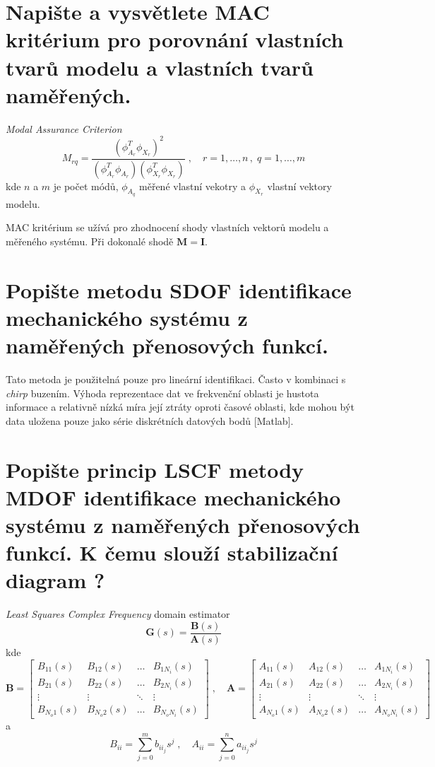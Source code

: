 \documentclass{article}
\begin{document}
	\section{Napište a vysvětlete MAC kritérium pro porovnání vlastních tvarů modelu a vlastních tvarů naměřených. }
	\emph{Modal Assurance Criterion}
	\begin{equation}
	M_{rq} = \frac{(\phi_{A_r}^T \phi_{X_r})^2}{(\phi_{A_r}^T\phi_{A_r})(\phi_{X_r}^T\phi_{X_r})}
	\;,\quad 
	r = 1,\dots,n \,,\; q = 1,\dots,m
	\end{equation}
	kde $n$ a $m$ je počet módů, $\phi_{A_q}$ měřené vlastní vekotry a $\phi_{X_r}$ vlastní vektory modelu.

	MAC kritérium se užívá pro zhodnocení shody vlastních vektorů modelu a měřeného systému. Při dokonalé shodě $\bm{M} = \bm{I}$.

	\section{Popište metodu SDOF identifikace mechanického systému z naměřených přenosových funkcí. }
	Tato metoda je použitelná pouze pro lineární identifikaci. Často v kombinaci s \emph{chirp} buzením. Výhoda reprezentace dat ve frekvenční oblasti je hustota informace a relativně nízká míra její ztráty oproti časové oblasti, kde mohou být data uložena pouze jako série diskrétních datových bodů [Matlab].

	\section{Popište princip LSCF metody MDOF identifikace mechanického systému z naměřených přenosových funkcí. K čemu slouží stabilizační diagram ? }
	\emph{Least Squares Complex Frequency} domain estimator
	\begin{equation}
		\bm{G}(s) = \frac{\bm{B}(s)}{\bm{A}(s)}
	\end{equation}
	kde
	\begin{equation}
		\bm{B}
		=
		\begin{bmatrix}
			B_{11}(s) & B_{12}(s) & \dots & B_{1N_i}(s) \\
			B_{21}(s) & B_{22}(s) & \dots & B_{2N_i}(s) \\
			\vdots & \vdots & \ddots & \vdots \\
			B_{N_o 1}(s) & B_{N_o 2}(s) & \dots & B_{N_o N_i}(s)
		\end{bmatrix}
		\;,\quad 
		\bm{A}
		=
		\begin{bmatrix}
			A_{11}(s) & A_{12}(s) & \dots & A_{1N_i}(s) \\
			A_{21}(s) & A_{22}(s) & \dots & A_{2N_i}(s) \\
			\vdots & \vdots & \ddots & \vdots \\
			A_{N_o 1}(s) & A_{N_o 2}(s) & \dots & A_{N_o N_i}(s)
		\end{bmatrix}
	\end{equation}
	a
	\begin{equation}
	B_{ii} = \sum_{j=0}^m b_{{ii}_j} s^j
	\;,\quad 
	A_{ii} = \sum_{j=0}^n a_{{ii}_j} s^j
	\end{equation}
\end{document}
